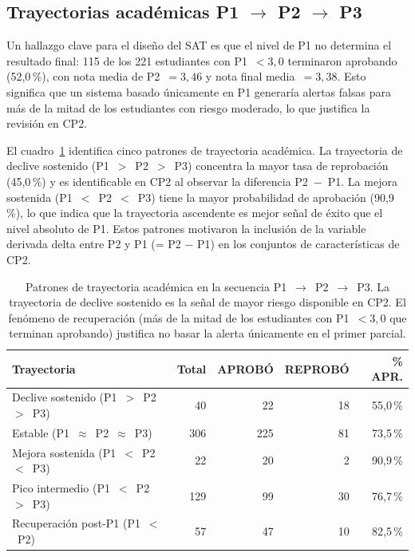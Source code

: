 \documentclass[12pt, letterpaper, openany]{report}
\begin{document}
\subsection{Trayectorias académicas P1 $\to$ P2 $\to$ P3}
\label{sssec:trayectorias}

Un hallazgo clave para el diseño del SAT es que el nivel de P1 no determina el resultado final: 115 de los 221 estudiantes con P1~$< 3{,}0$ terminaron aprobando (52,0\,\%), con nota media de P2~$= 3{,}46$ y nota final media~$= 3{,}38$. Esto significa que un sistema basado únicamente en P1 generaría alertas falsas para más de la mitad de los estudiantes con riesgo moderado, lo que justifica la revisión en CP2.

El cuadro~\ref{tab:trayectorias} identifica cinco patrones de trayectoria académica. La trayectoria de declive sostenido (P1~$>$~P2~$>$~P3) concentra la mayor tasa de reprobación (45,0\,\%) y es identificable en CP2 al observar la diferencia P2~$-$~P1. La mejora sostenida (P1~$<$~P2~$<$~P3) tiene la mayor probabilidad de aprobación (90,9\,\%), lo que indica que la trayectoria ascendente es mejor señal de éxito que el nivel absoluto de P1. Estos patrones motivaron la inclusión de la variable derivada delta entre P2 y P1 (= P2 $-$ P1) en los conjuntos de características de CP2.

\begin{table}[htbp]
  \centering
  \caption{Patrones de trayectoria académica en la secuencia P1~$\to$~P2~$\to$~P3. La trayectoria de declive sostenido es la señal de mayor riesgo disponible en CP2. El fenómeno de recuperación  (más de la mitad de los estudiantes con P1~$< 3{,}0$ que terminan aprobando) justifica no basar la alerta únicamente en el primer parcial.}
  \label{tab:trayectorias}
  \begin{tabular}{lrrrr}
    \toprule
    Trayectoria & Total & APROBÓ & REPROBÓ & \% APR. \\
    \midrule
    Declive sostenido (P1~$>$~P2~$>$~P3)      &  40 &  22 &  18 & 55,0\,\% \\
    Estable (P1~$\approx$~P2~$\approx$~P3)     & 306 & 225 &  81 & 73,5\,\% \\
    Mejora sostenida (P1~$<$~P2~$<$~P3)        &  22 &  20 &   2 & 90,9\,\% \\
    Pico intermedio (P1~$<$~P2~$>$~P3)         & 129 &  99 &  30 & 76,7\,\% \\
    Recuperación post-P1 (P1~$<$~P2)           &  57 &  47 &  10 & 82,5\,\% \\
    \bottomrule
  \end{tabular}
\end{table}
\end{document}
